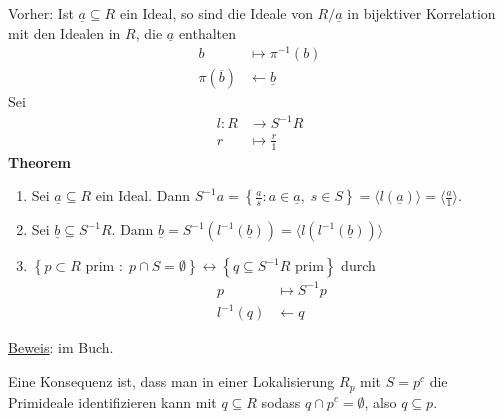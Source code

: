 \documentclass[a4paper, 12pt]{article}
\begin{document}
Vorher: Ist $\underline{a} \subseteq R$ ein Ideal, so sind die Ideale von $R/\underline{a}$ in bijektiver Korrelation mit den Idealen in $R$, die $\underline{a}$ enthalten \begin{align*}
	b & \mapsto \pi^{-1}(b)\\
	\pi(\overline{b}) &\gets \underline{b}
\end{align*}
Sei \begin{align*}
	l: R &\to S^{-1}R\\
	r &\mapsto \frac{r}{1}
\end{align*}
\textbf{Theorem}
\begin{enumerate}
	\item Sei $\underline{a} \subseteq R$ ein Ideal. Dann $S^{-1}a = \left\{\frac{a}{s}: a \in \underline{a}, \; s \in S\right\} = \langle l(\underline{a})\rangle = \langle \frac{a}{1} \rangle$.
	\item Sei $\underline{b} \subseteq S^{-1}R$. Dann $\underline{b} = S^{-1}(l^{-1}(\underline{b})) = \langle l(l^{-1}(\underline{b})) \rangle$
	\item $\left\{p \subset R \text{ prim }: \; p \cap S = \emptyset\right\} \leftrightarrow \left\{q \subseteq S^{-1}R \text{ prim}\right\}$ durch \begin{align*}
		p &\mapsto S^{-1}p\\
		l^{-1}(q) &\gets q
	\end{align*}
\end{enumerate}
\underline{Beweis}: im Buch. 

Eine Konsequenz ist, dass man in einer Lokalisierung $R_p$ mit $S = p^c$ die Primideale identifizieren kann mit $q \subseteq R$ sodass $q \cap p^c = \emptyset$, also $q \subseteq p$.
\end{document}
